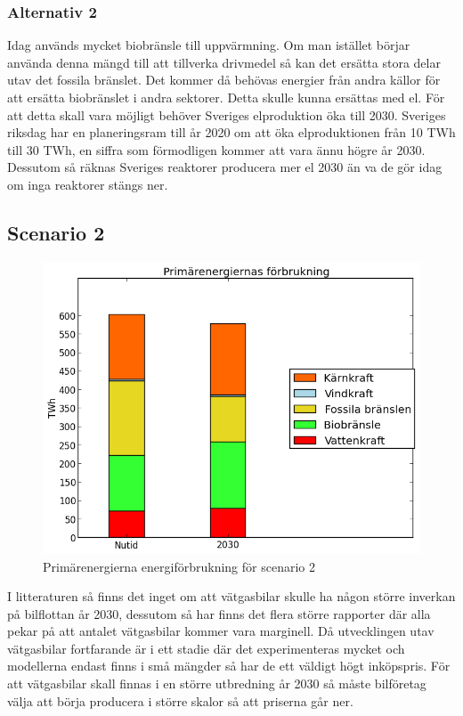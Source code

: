 \documentclass[a4paper,11pt,fleqn, titlepage]{article}
\begin{document}
\subsubsection{Alternativ 2}

Idag används mycket biobränsle till uppvärmning. Om man istället börjar använda denna mängd till att tillverka drivmedel så kan det ersätta stora delar utav det fossila bränslet. Det kommer då behövas energier från andra källor för att ersätta biobränslet i andra sektorer. Detta skulle kunna ersättas med el. För att detta skall vara möjligt behöver Sveriges elproduktion öka till 2030. Sveriges riksdag har en planeringsram till år 2020 om att öka elproduktionen från 10 TWh till 30 TWh, en siffra som förmodligen kommer att vara ännu högre år 2030. Dessutom så räknas Sveriges reaktorer producera mer el 2030 än va de gör idag om inga reaktorer stängs ner.


\subsection{Scenario 2}
\begin{figure}[h!]
       \centering
       \includegraphics[scale=0.7]{scen2energidiagram.png}
       \caption{Primärenergierna energiförbrukning för scenario 2}
       \label{fig:scen2energydiagram}
\end{figure}
I litteraturen så finns det inget om att vätgasbilar skulle ha någon större inverkan på bilflottan år 2030, dessutom så har finns det flera större rapporter där alla pekar på att antalet vätgasbilar kommer vara marginell.
Då utvecklingen utav vätgasbilar fortfarande är i ett stadie där det experimenteras mycket och modellerna endast finns i små mängder så har de ett väldigt högt inköpspris. För att vätgasbilar skall finnas i en större utbredning år 2030 så måste bilföretag välja att börja producera i större skalor så att priserna går ner.
\end{document}
